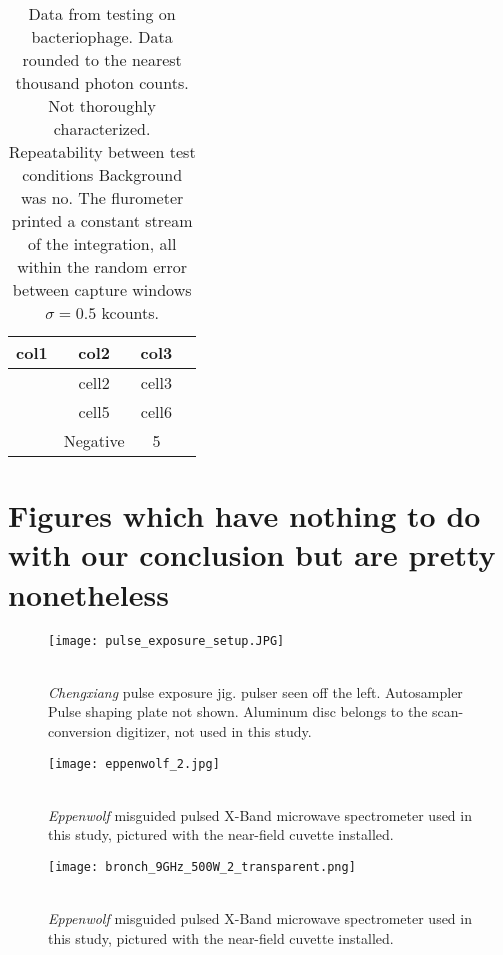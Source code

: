 \documentclass[fleqn,10pt]{article}
\begin{document}



\begin{table}[h!]
	\centering
	\begin{tabular}{ |c|c|c|c| } 
		\hline
		col1 & col2 & col3 \\
		\hline
		& cell2 & cell3 \\ 
		& cell5 & cell6 \\ 
		& Negative & 5 \\ 
		\hline
	\end{tabular}

	\caption{Data from testing on bacteriophage. Data rounded to the nearest thousand photon counts. Not thoroughly characterized. Repeatability between test conditions   Background was no. 
	The flurometer printed a constant stream of the integration, all within the random error between capture windows $\sigma=0.5$ kcounts. }
\end{table}


\section{Figures which have nothing to do with our conclusion but are pretty nonetheless}

\begin{figure}[H]
	\captionsetup{singlelinecheck = false, justification=justified}
	\centering
	\texttt{[image: pulse\_exposure\_setup.JPG]}
	\caption{\\ \textit{Chengxiang} pulse exposure jig. pulser seen off the left. Autosampler Pulse shaping plate not shown. Aluminum disc belongs to the scan-conversion digitizer, not used in this study.}
\end{figure}
	
\begin{figure}[H]
	\captionsetup{singlelinecheck = false, justification=justified}
	\centering
	\texttt{[image: eppenwolf\_2.jpg]}
	\caption{\\ \textit{Eppenwolf} misguided pulsed X-Band microwave spectrometer used in this study, pictured with the near-field cuvette installed.}
\end{figure}

\begin{figure}[H]
	\captionsetup{singlelinecheck = false, justification=justified}
	\centering
	\texttt{[image: bronch\_9GHz\_500W\_2\_transparent.png]}
	\caption{\\ \textit{Eppenwolf} misguided pulsed X-Band microwave spectrometer used in this study, pictured with the near-field cuvette installed.}
\end{figure}
\end{document}
